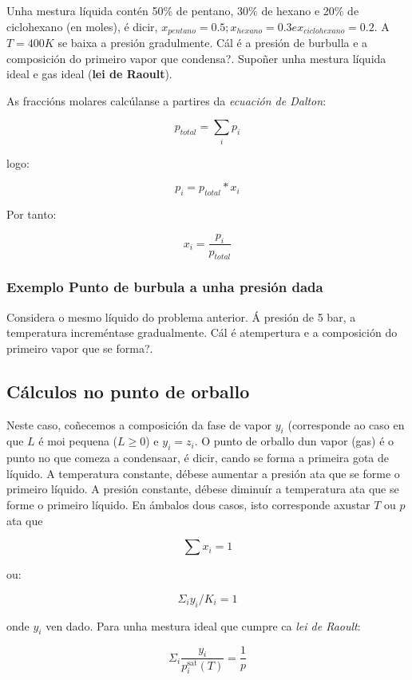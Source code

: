 \documentclass[
  letterpaper,
  DIV=11,
  numbers=noendperiod]{scrartcl}
\begin{document}
Unha mestura líquida contén 50\% de pentano, 30\% de hexano e 20\% de
ciclohexano (en moles), é dicir,
\(x_{pentano} = 0.5; x_{hexano} = 0.3 e x_{ciclohexano} = 0.2\). A
\(T = 400 K\) se baixa a presión gradulmente. Cál é a presión de
burbulla e a composición do primeiro vapor que condensa?. Supoñer unha
mestura líquida ideal e gas ideal (\textbf{lei de Raoult}).

As fraccións molares calcúlanse a partires da \emph{ecuación de Dalton}:

\[
p_{total} = \sum_i p_i
\]

logo:

\[
p_i = p_{total}* x_i
\]

Por tanto:

\[
x_i = \frac{p_i}{p_{total}}
\]

\subsubsection{Exemplo Punto de burbula a unha presión
dada}\label{exemplo-punto-de-burbula-a-unha-presiuxf3n-dada}

Considera o mesmo líquido do problema anterior. Á presión de 5 bar, a
temperatura increméntase gradualmente. Cál é atempertura e a composición
do primeiro vapor que se forma?.

\subsection{Cálculos no punto de
orballo}\label{cuxe1lculos-no-punto-de-orballo}

Neste caso, coñecemos a composición da fase de vapor \(y_i\)
(corresponde ao caso en que \(L\) é moi pequena (\(L \geq 0\)) e
\(y_i = z_i\). O punto de orballo dun vapor (gas) é o punto no que
comeza a condensaar, é dicir, cando se forma a primeira gota de líquido.
A temperatura constante, débese aumentar a presión ata que se forme o
primeiro líquido. A presión constante, débese diminuír a temperatura ata
que se forme o primeiro líquido. En ámbalos dous casos, isto corresponde
axustar \(T\) ou \(p\) ata que

\[
\sum x_i = 1
\]

ou:

\[
\Sigma_{i} y_{i} / K_{i}=1
\]

onde \(y_i\) ven dado. Para unha mestura ideal que cumpre ca \emph{lei
de Raoult}:

\[
\Sigma_{i} \frac{y_{i}}{p_{i}^{\mathrm{sat}}(T)}=\frac{1}{p}
\]
\end{document}
